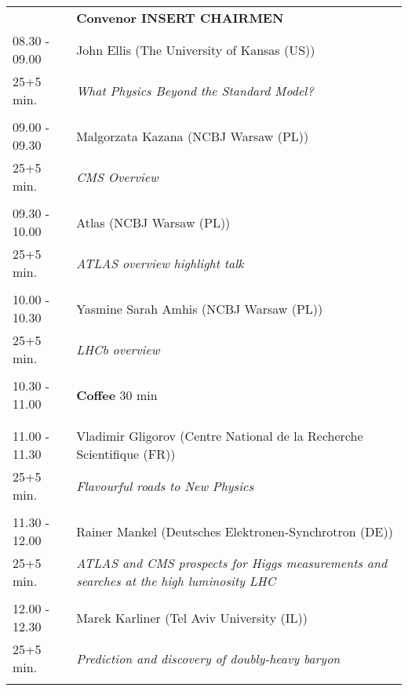 \begin{longtable}{p{3cm}p{13cm}}
&\hfill {\bf Convenor INSERT CHAIRMEN }\\ 
08.30 - 09.00 & John Ellis (The University of Kansas (US))\\ 
25+5 min. & {\it What Physics Beyond the Standard Model?}\\ 
 & \\ 
09.00 - 09.30 & Malgorzata Kazana (NCBJ Warsaw (PL))\\ 
25+5 min. & {\it CMS Overview}\\ 
 & \\ 
09.30 - 10.00 & Atlas (NCBJ Warsaw (PL))\\ 
25+5 min. & {\it ATLAS overview highlight talk}\\ 
 & \\ 
10.00 - 10.30 & Yasmine Sarah Amhis (NCBJ Warsaw (PL))\\ 
25+5 min. & {\it LHCb overview}\\ 
 & \\ 
10.30 - 11.00 & {\bf Coffee} \hfill 30 min \\ 
 & \\ 
 & \\ 
11.00 - 11.30 & Vladimir Gligorov (Centre National de la Recherche Scientifique (FR))\\ 
25+5 min. & {\it Flavourful roads to New Physics}\\ 
 & \\ 
11.30 - 12.00 & Rainer Mankel (Deutsches Elektronen-Synchrotron (DE))\\ 
25+5 min. & {\it ATLAS and CMS prospects for Higgs measurements and searches at the high luminosity LHC}\\ 
 & \\ 
12.00 - 12.30 & Marek Karliner (Tel Aviv University (IL))\\ 
25+5 min. & {\it Prediction and discovery of doubly-heavy baryon}\\ 
 & \\ 
\end{longtable}


